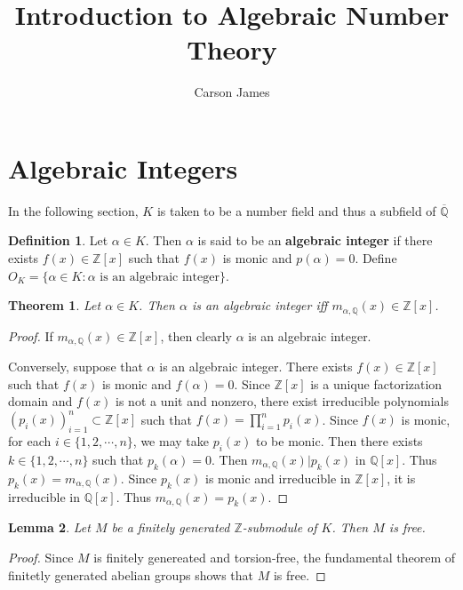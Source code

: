\documentclass[12pt]{amsart}
\newtheorem{thm}{Theorem}[subsection]
\newtheorem{lem}[thm]{Lemma}
\theoremstyle{definition}
\newtheorem{defn}[definition]{Definition}
\theoremstyle{remark}
\theoremstyle{definition}
\newcommand{\al}{\alpha}
\newcommand{\Z}{\mathbb{Z}}
\newcommand{\Q}{\mathbb{Q}}
\begin{document}
\title{Introduction to Algebraic Number Theory}
\author{Carson James}
\maketitle

\tableofcontents

\section{Algebraic Integers}

In the following section, $K$ is taken to be a number field and thus a subfield of $\overline{\Q}$

\begin{defn}
Let $\al \in K$. Then $\al$ is said to be an \textbf{algebraic integer} if there exists $f(x) \in \Z[x]$ such that $f(x)$ is monic and $p(\al) = 0$. Define $O_K = \{\al \in K: \al \text{ is an algebraic integer}\}$.
\end{defn}

\begin{thm}
Let $\al \in K$. Then $\al$ is an algebraic integer iff $m_{\al, \Q}(x) \in \Z[x]$.
\end{thm}

\begin{proof}
If $m_{\al, \Q}(x) \in \Z[x]$, then clearly $\al$ is an algebraic integer.\vspace{2mm}

Conversely, suppose that $\al$ is an algebraic integer. There exists $f(x) \in \Z[x]$ such that $f(x)$ is monic and $f(\al)=0$. Since $\Z[x]$ is a unique factorization domain and $f(x)$ is not a unit and nonzero, there exist irreducible polynomials $(p_i(x))_{i=1}^n \subset \Z[x]$ such that $f(x) = \prod\limits_{i=1}^np_i(x)$. Since $f(x)$ is monic, for each $i \in \{1,2,\cdots,n\}$, we may take $p_i(x)$ to be monic. Then there exists $k \in \{1,2,\cdots,n\}$ such that $p_k(\al)=0$. Then $m_{\al, \Q}(x)|p_k(x)$ in $\Q[x]$. Thus $p_k(x)=m_{\al, \Q}(x)$. Since $p_k(x)$ is monic and irreducible in $\Z[x]$, it is irreducible in $\Q[x]$. Thus $m_{\al, \Q}(x)=p_k(x)$. 
\end{proof} 

\begin{lem}
Let $M$ be a finitely generated $\Z$-submodule of $K$. Then $M$ is free. 
\end{lem}

\begin{proof}
Since $M$ is finitely genereated and torsion-free, the fundamental theorem of finitetly generated abelian groups shows that $M$ is free.
\end{proof}
\end{document}
